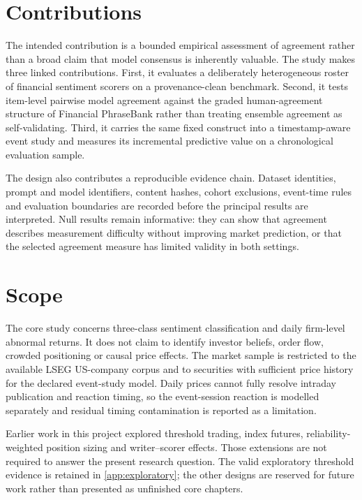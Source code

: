 \documentclass[11pt,a4paper,oneside]{book}
\begin{document}
\section{Contributions}
\label{sec:contributions}

The intended contribution is a bounded empirical assessment of agreement rather than a broad claim that model consensus is inherently valuable.
The study makes three linked contributions.
First, it evaluates a deliberately heterogeneous roster of financial sentiment scorers on a provenance-clean benchmark.
Second, it tests item-level pairwise model agreement against the graded human-agreement structure of Financial PhraseBank rather than treating ensemble agreement as self-validating.
Third, it carries the same fixed construct into a timestamp-aware event study and measures its incremental predictive value on a chronological evaluation sample.

The design also contributes a reproducible evidence chain.
Dataset identities, prompt and model identifiers, content hashes, cohort exclusions, event-time rules and evaluation boundaries are recorded before the principal results are interpreted.
Null results remain informative: they can show that agreement describes measurement difficulty without improving market prediction, or that the selected agreement measure has limited validity in both settings.

\section{Scope}
\label{sec:scope}

The core study concerns three-class sentiment classification and daily firm-level abnormal returns.
It does not claim to identify investor beliefs, order flow, crowded positioning or causal price effects.
The market sample is restricted to the available LSEG US-company corpus and to securities with sufficient price history for the declared event-study model.
Daily prices cannot fully resolve intraday publication and reaction timing, so the event-session reaction is modelled separately and residual timing contamination is reported as a limitation.

Earlier work in this project explored threshold trading, index futures, reliability-weighted position sizing and writer--scorer effects.
Those extensions are not required to answer the present research question.
The valid exploratory threshold evidence is retained in \cref{app:exploratory}; the other designs are reserved for future work rather than presented as unfinished core chapters.
\end{document}
